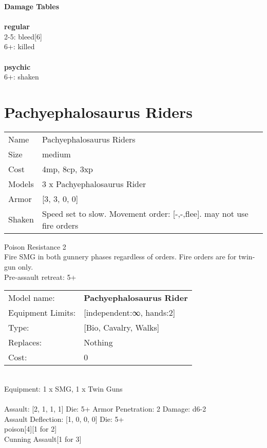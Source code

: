 {\bf Damage Tables} \\
\ \\ {\bf regular } \\
2-5: bleed[6] \\
6+: killed \\
\ \\ {\bf psychic } \\
6+: shaken \\










\pagebreak\pagebreak

\section{ Pachyephalosaurus Riders }

\begin{tabular}{ll}
  Name & Pachyephalosaurus Riders \\
  Size & medium\\
  Cost & 4mp, 8cp, 3xp\\
  Models & 3 x Pachyephalosaurus Rider\\
  Armor & [3, 3, 0, 0]\\
  Shaken & Speed set to slow. Movement order: [-,-,flee]. may not use fire orders\\
\end{tabular}

\noindent Poison Resistance 2\\ 
Fire SMG in both gunnery phases regardless of orders. Fire orders are for twin-gun only.\\ 
Pre-assault retreat: 5+\\ 


\noindent
\begin{tabular}{ll}
Model name: &{\bf Pachyephalosaurus Rider } \\
Equipment Limits: &[independent:∞, hands:2] \\
Type: &[Bio, Cavalry, Walks] \\
Replaces: &Nothing \\
Cost: & 0\\
\end{tabular}
\ \\
Equipment: 1 x SMG, 1 x Twin Guns \\
\ \\
Assault: [2, 1, 1, 1] Die: 5+ Armor Penetration: 2 Damage: d6-2 \\
Assault Deflection: [1, 0, 0, 0] Die: 5+\\
\indent poison[4][1 for 2]\\ 
Cunning Assault[1 for 3]\\ 
 
